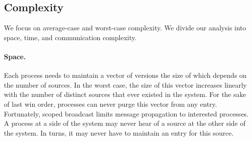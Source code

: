 





\subsection{Complexity}

We focus on average-case and worst-case complexity. We divide our
analysis into space, time, and communication complexity.

\paragraph{Space.}
Each process needs to maintain a vector of versions the size of which
depends on the number of sources. In the worst case, the size of this
vector increases linearly with the number of distinct sources that
ever existed in the system. For the sake of last win order, processes
can never purge this vector from any entry.  Fortunately, scoped broadcast limits
message propagation to interested processes. A process at a side of
the system may never hear of a source at the other side of the
system. In turns, it may never have to maintain an entry for this
source. 

